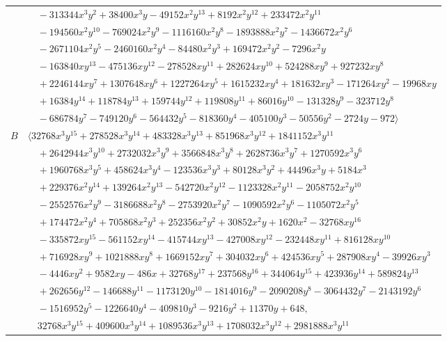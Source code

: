 \documentclass[11pt]{article}
\begin{document}
\begin{longtable}{@{}ll@{}}
 & $\quad -313344x^{3}y^{2}+38400x^{3}y-49152x^{2}y^{13}+8192x^{2}y^{12}+233472x^{2}y^{11}$\\
 & $\quad -194560x^{2}y^{10}-769024x^{2}y^{9}-1116160x^{2}y^{8}-1893888x^{2}y^{7}-1436672x^{2}y^{6}$\\
 & $\quad -2671104x^{2}y^{5}-2460160x^{2}y^{4}-84480x^{2}y^{3}+169472x^{2}y^{2}-7296x^{2}y$\\
 & $\quad -163840xy^{13}-475136xy^{12}-278528xy^{11}+282624xy^{10}+524288xy^{9}+927232xy^{8}$\\
 & $\quad +2246144xy^{7}+1307648xy^{6}+1227264xy^{5}+1615232xy^{4}+181632xy^{3}-171264xy^{2}-19968xy$\\
 & $\quad +16384y^{14}+118784y^{13}+159744y^{12}+119808y^{11}+86016y^{10}-131328y^{9}-323712y^{8}$\\
 & $\quad -686784y^{7}-749120y^{6}-564432y^{5}-818360y^{4}-405100y^{3}-50556y^{2}-2724y-972\rangle$\\
$B$ & $\langle 32768x^{3}y^{15}+278528x^{3}y^{14}+483328x^{3}y^{13}+851968x^{3}y^{12}+1841152x^{3}y^{11}$\\
 & $\quad +2642944x^{3}y^{10}+2732032x^{3}y^{9}+3566848x^{3}y^{8}+2628736x^{3}y^{7}+1270592x^{3}y^{6}$\\
 & $\quad +1960768x^{3}y^{5}+458624x^{3}y^{4}-123536x^{3}y^{3}+80128x^{3}y^{2}+44496x^{3}y+5184x^{3}$\\
 & $\quad +229376x^{2}y^{14}+139264x^{2}y^{13}-542720x^{2}y^{12}-1123328x^{2}y^{11}-2058752x^{2}y^{10}$\\
 & $\quad -2552576x^{2}y^{9}-3186688x^{2}y^{8}-2753920x^{2}y^{7}-1090592x^{2}y^{6}-1105072x^{2}y^{5}$\\
 & $\quad +174472x^{2}y^{4}+705868x^{2}y^{3}+252356x^{2}y^{2}+30852x^{2}y+1620x^{2}-32768xy^{16}$\\
 & $\quad -335872xy^{15}-561152xy^{14}-415744xy^{13}-427008xy^{12}-232448xy^{11}+816128xy^{10}$\\
 & $\quad +716928xy^{9}+1021888xy^{8}+1669152xy^{7}+304032xy^{6}+424536xy^{5}+287908xy^{4}-39926xy^{3}$\\
 & $\quad -4446xy^{2}+9582xy-486x+32768y^{17}+237568y^{16}+344064y^{15}+423936y^{14}+589824y^{13}$\\
 & $\quad +262656y^{12}-146688y^{11}-1173120y^{10}-1814016y^{9}-2090208y^{8}-3064432y^{7}-2143192y^{6}$\\
 & $\quad -1516952y^{5}-1226640y^{4}-409810y^{3}-9216y^{2}+11370y+648,$\\
 & $\quad 32768x^{3}y^{15}+409600x^{3}y^{14}+1089536x^{3}y^{13}+1708032x^{3}y^{12}+2981888x^{3}y^{11}$\\

\end{longtable}
\end{document}
